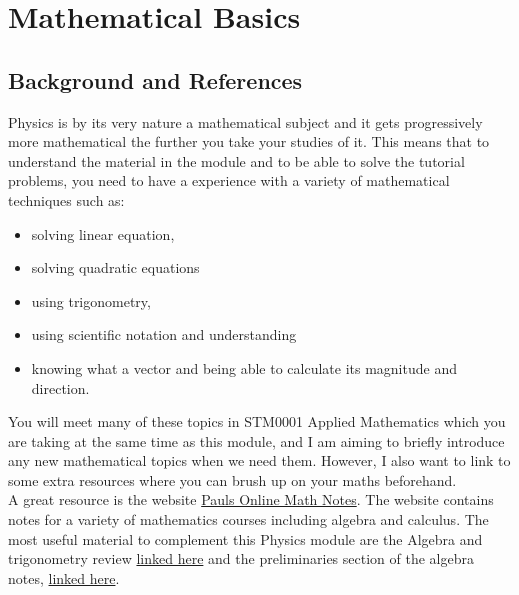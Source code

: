 \documentclass[a4paper,12pt]{book}
\begin{document}


\chapter{Mathematical Basics}
\section{Background and References}
Physics is by its very nature a mathematical subject and it gets progressively more mathematical the further you take your studies of it. This means that to understand the material in the module and to be able to solve the tutorial problems, you need to have a experience with a variety of mathematical techniques such as:
\begin{itemize}
\setlength{\itemsep}{-5pt}
    \item solving linear equation,
    \item solving quadratic equations
    \item using trigonometry,
    \item using scientific notation and understanding 
    \item knowing what a vector and being able to calculate its magnitude and direction.
\end{itemize}

You will meet many of these topics in STM0001 Applied Mathematics which you are taking at the same time as this module, and I am aiming to briefly introduce any new mathematical topics when we need them. However, I also want to link to some extra resources where you can brush up on your maths beforehand.\\


A great resource is the website \href{https://tutorial.math.lamar.edu/}{Pauls Online Math Notes}. The website contains notes for a variety of mathematics courses including algebra and calculus. The most useful material to complement this Physics module are the Algebra and trigonometry review \href{https://tutorial.math.lamar.edu/Extras/AlgebraTrigReview/AlgebraTrigIntro.aspx}{linked here} and the preliminaries section of the algebra notes, \href{https://tutorial.math.lamar.edu/Classes/Alg/Preliminaries.aspx}{linked here}.\\
\end{document}
